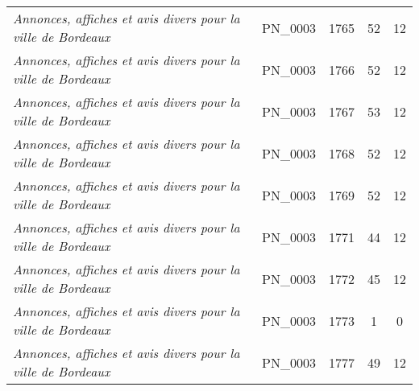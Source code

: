 \begin{table}[ht]
{\begin{tabular}{lcccc}
			\textit{Annonces, affiches et avis divers pour la ville de Bordeaux} & PN\_0003                           & 1765                                & 52                                                & 12                                              \\ 
			\textit{Annonces, affiches et avis divers pour la ville de Bordeaux} & PN\_0003                           & 1766                                & 52                                                & 12                                              \\ 
			\textit{Annonces, affiches et avis divers pour la ville de Bordeaux} & PN\_0003                           & 1767                                & 53                                                & 12                                              \\ 
			\textit{Annonces, affiches et avis divers pour la ville de Bordeaux} & PN\_0003                           & 1768                                & 52                                                & 12                                              \\ 
			\textit{Annonces, affiches et avis divers pour la ville de Bordeaux} & PN\_0003                           & 1769                                & 52                                                & 12                                              \\ 
			\textit{Annonces, affiches et avis divers pour la ville de Bordeaux} & PN\_0003                           & 1771                                & 44                                                & 12                                              \\ 
			\textit{Annonces, affiches et avis divers pour la ville de Bordeaux} & PN\_0003                           & 1772                                & 45                                                & 12                                              \\ 
			\textit{Annonces, affiches et avis divers pour la ville de Bordeaux} & PN\_0003                           & 1773                                & 1                                                 & 0                                               \\ 
			\textit{Annonces, affiches et avis divers pour la ville de Bordeaux} & PN\_0003                           & 1777                                & 49                                                & 12                                              \\ 

\end{tabular}}
\end{table}
